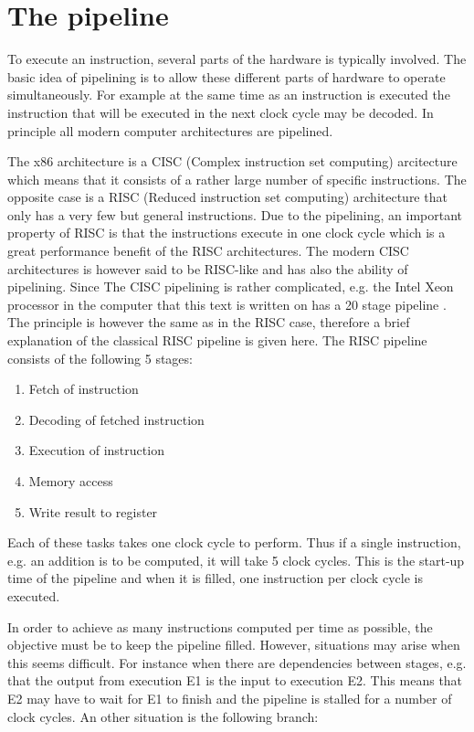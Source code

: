 \section{The pipeline}
To execute an instruction, several parts of the hardware is typically
involved. The basic idea of pipelining is to allow these different
parts of hardware to operate simultaneously. For example at the same
time as an instruction is executed the instruction that will be
executed in the next clock cycle may be decoded. In principle all
modern computer architectures are pipelined.

The x86 architecture is a CISC (Complex instruction set computing)
arcitecture which means that it consists of a rather large number of
specific instructions. The opposite case is a RISC (Reduced
instruction set computing) architecture that only has a very few but
general instructions. Due to the pipelining, an important property of
RISC is that the instructions execute in one clock cycle which is a
great performance benefit of the RISC architectures. The modern CISC
architectures is however said to be RISC-like and has also the ability
of pipelining. Since The CISC pipelining is rather complicated,
e.g. the Intel Xeon processor in the computer that this text is
written on has a 20 stage pipeline \cite{intel-xeon}. The principle is
however the same as in the RISC case, therefore a brief explanation of
the classical RISC pipeline is given here. The RISC pipeline consists
of the following 5 stages:

\begin{enumerate}
  \item Fetch of instruction 
  \item Decoding of fetched instruction
  \item Execution of instruction
  \item Memory access
  \item Write result to register
\end{enumerate}

Each of these tasks takes one clock cycle to perform. Thus if a single
instruction, e.g. an addition is to be computed, it will take 5 clock
cycles. This is the start-up time of the pipeline and when it is
filled, one instruction per clock cycle is executed. 

In order to achieve as many instructions computed per time as
possible, the objective must be to keep the pipeline filled. However,
situations may arise when this seems difficult. For instance when
there are dependencies between stages, e.g. that the output from
execution E1 is the input to execution E2. This means that E2 may have
to wait for E1 to finish and the pipeline is stalled for a number of
clock cycles. An other situation is the following branch:

